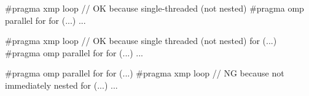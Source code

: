 \begin{XCexample}
#pragma xmp loop  // OK because single-threaded (not nested)
#pragma omp parallel for
for (...){
  ...
}
\end{XCexample}

\begin{XCexample}
#pragma xmp loop  // OK because single threaded (not nested)
for (...){
  #pragma omp parallel for
  for (...) { ... }
}
\end{XCexample}

\begin{XCexample}
#pragma omp parallel for 
for (...){
  #pragma xmp loop  // NG because not immediately nested
  for (...) { ... }
}
\end{XCexample}
